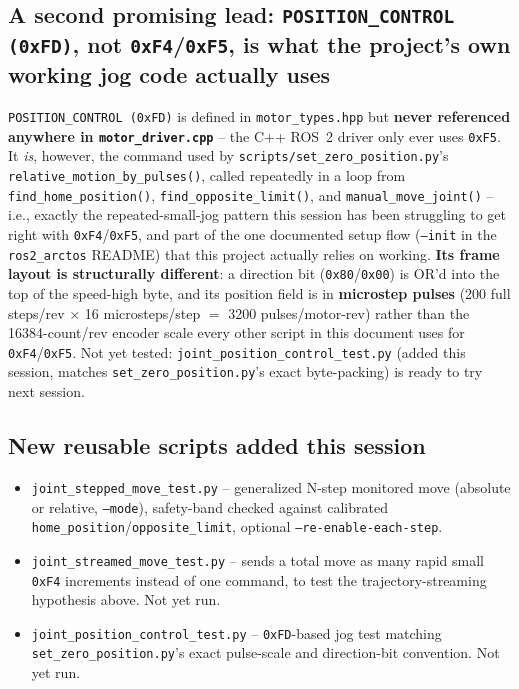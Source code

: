 \documentclass[11pt,letterpaper]{article}
\begin{document}
\subsection{A second promising lead: \texttt{POSITION\_CONTROL (0xFD)}, not \texttt{0xF4}/\texttt{0xF5}, is what the project's own working jog code actually uses}
\texttt{POSITION\_CONTROL (0xFD)} is defined in \texttt{motor\_types.hpp} but \textbf{never referenced anywhere in \texttt{motor\_driver.cpp}} -- the C++ ROS~2 driver only ever uses \texttt{0xF5}. It \emph{is}, however, the command used by \texttt{scripts/set\_zero\_position.py}'s \texttt{relative\_motion\_by\_pulses()}, called repeatedly in a loop from \texttt{find\_home\_position()}, \texttt{find\_opposite\_limit()}, and \texttt{manual\_move\_joint()} -- i.e., exactly the repeated-small-jog pattern this session has been struggling to get right with \texttt{0xF4}/\texttt{0xF5}, and part of the one documented setup flow (\texttt{--init} in the \texttt{ros2\_arctos} README) that this project actually relies on working. \textbf{Its frame layout is structurally different}: a direction bit (\texttt{0x80}/\texttt{0x00}) is OR'd into the top of the speed-high byte, and its position field is in \textbf{microstep pulses} (200 full steps/rev $\times$ 16 microsteps/step $=$ 3200 pulses/motor-rev) rather than the 16384-count/rev encoder scale every other script in this document uses for \texttt{0xF4}/\texttt{0xF5}. Not yet tested: \texttt{joint\_position\_control\_test.py} (added this session, matches \texttt{set\_zero\_position.py}'s exact byte-packing) is ready to try next session.

\subsection{New reusable scripts added this session}
\begin{itemize}
    \item \texttt{joint\_stepped\_move\_test.py} -- generalized N-step monitored move (absolute or relative, \texttt{--mode}), safety-band checked against calibrated \texttt{home\_position}/\texttt{opposite\_limit}, optional \texttt{--re-enable-each-step}.
    \item \texttt{joint\_streamed\_move\_test.py} -- sends a total move as many rapid small \texttt{0xF4} increments instead of one command, to test the trajectory-streaming hypothesis above. Not yet run.
    \item \texttt{joint\_position\_control\_test.py} -- \texttt{0xFD}-based jog test matching \texttt{set\_zero\_position.py}'s exact pulse-scale and direction-bit convention. Not yet run.
\end{itemize}
\end{document}
